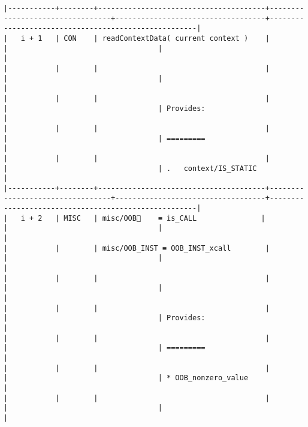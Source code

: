 \documentclass[varwidth=\maxdimen,margin=0.5cm,multi={verbatim}]{standalone}
\begin{document}
\begin{verbatim}
|-----------+--------+---------------------------------------+---------------------------------+-----------------------------------+-----------------------------------------------------|
|   i + 1   | CON    | readContextData( current context )    |                                 |                                   |                                                     |
|           |        |                                       |                                 |                                   |                                                     |
|           |        |                                       |                                 |                                   | Provides:                                           |
|           |        |                                       |                                 |                                   | =========                                           |
|           |        |                                       |                                 |                                   | .   context/IS_STATIC                               |
|-----------+--------+---------------------------------------+---------------------------------+-----------------------------------+-----------------------------------------------------|
|   i + 2   | MISC   | misc/OOB🚩    ≡ is_CALL               |                                 |                                   |                                                     |
|           |        | misc/OOB_INST ≡ OOB_INST_xcall        |                                 |                                   |                                                     |
|           |        |                                       |                                 |                                   |                                                     |
|           |        |                                       |                                 |                                   | Provides:                                           |
|           |        |                                       |                                 |                                   | =========                                           |
|           |        |                                       |                                 |                                   | * OOB_nonzero_value                                 |
|           |        |                                       |                                 |                                   |                                                     |

\end{verbatim}
\end{document}
